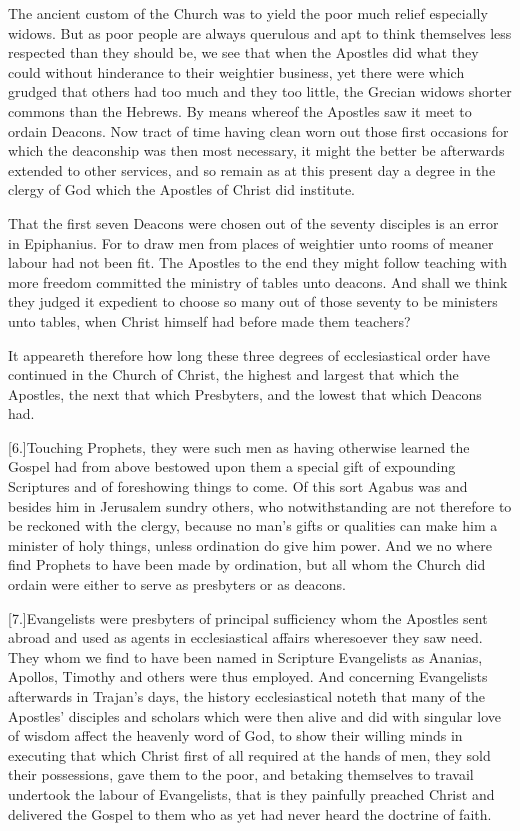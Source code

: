 The ancient custom of the Church was to yield the poor much relief especially widows. But as poor people are always querulous and apt to think themselves less respected than they should be, we see that when the Apostles did what they could without hinderance to their weightier business, yet there were which grudged that others had too much and they too little, the Grecian widows shorter commons than the Hebrews. By means whereof the Apostles saw it meet to ordain Deacons. Now tract of time having clean worn out those first occasions for which the deaconship was then most necessary, it might the better be afterwards extended to other services, and so remain as at this present day a degree in the clergy of God which the Apostles of Christ did institute.




That the first seven Deacons were chosen out of the seventy disciples is an error in Epiphanius. For to draw men from places of weightier unto rooms of meaner labour had not been fit. The Apostles to the end they might follow teaching with more freedom committed the ministry of tables unto deacons. And shall we think they judged it expedient to choose so many out of those seventy to be ministers unto tables, when Christ himself had before made them teachers?

It appeareth therefore how long these three degrees of ecclesiastical order have continued in the Church of Christ, the highest and largest that which the Apostles, the next that which Presbyters, and the lowest that which Deacons had.

[6.]Touching Prophets, they were such men as having otherwise learned the Gospel had from above bestowed upon them a special gift of expounding Scriptures and of foreshowing things to come. Of this sort Agabus was and besides him in Jerusalem sundry others, who notwithstanding are not therefore to be reckoned with the clergy, because no man’s gifts or qualities can make him a minister of holy things, unless ordination do give him power. And we no where find Prophets to have been made by ordination, but all whom the Church did ordain were either to serve as presbyters or as deacons.

[7.]Evangelists were presbyters of principal sufficiency whom the Apostles sent abroad and used as agents in ecclesiastical affairs wheresoever they saw need. They whom we find to have been named in Scripture Evangelists as Ananias, Apollos, Timothy and others were thus employed. And  concerning Evangelists afterwards in Trajan’s days,
 the history ecclesiastical noteth that many of the Apostles’ disciples and scholars which were then alive and did with singular love of wisdom affect the heavenly word of God, to show their willing minds in executing that which Christ first of all required at the hands of men, they sold their possessions, gave them to the poor, and betaking themselves to travail undertook the labour of Evangelists, that is they painfully preached Christ and delivered the Gospel to them who as yet had never heard the doctrine of faith.


